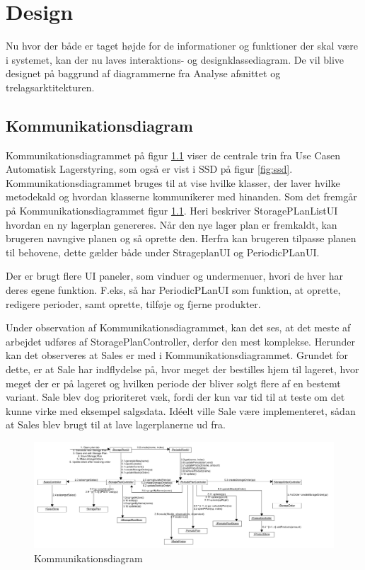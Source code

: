 \chapter{Design}\label{ch:design}
Nu hvor der både er taget højde for de informationer og funktioner der skal være i systemet, kan der nu laves interaktions- og designklassediagram. De vil blive designet på baggrund af diagrammerne fra Analyse afsnittet og trelagsarktitekturen. 

\section{Kommunikationsdiagram}
Kommunikationsdiagrammet\cite{Larman2004} på figur \ref{fig:Kommunikationsdiagram} viser de centrale trin fra Use Casen Automatisk Lagerstyring, som også er vist i SSD på figur \ref{fig:ssd}. Kommunikationsdiagrammet bruges til at vise hvilke klasser, der laver hvilke metodekald og hvordan klasserne kommunikerer med hinanden. 
Som det fremgår på Kommunikationsdiagrammet figur \ref{fig:Kommunikationsdiagram}. Heri beskriver StoragePLanListUI hvordan en ny lagerplan genereres. Når den nye lager plan er fremkaldt, kan brugeren navngive planen og så oprette den. Herfra kan brugeren tilpasse planen til behovene, dette gælder både under StrageplanUI og PeriodicPLanUI. 

Der er brugt flere UI paneler, som vinduer og undermenuer, hvori de hver har deres egene funktion. 
F.eks, så har PeriodicPLanUI som funktion, at oprette, redigere perioder, samt oprette, tilføje og fjerne produkter. 

Under observation af Kommunikationsdiagrammet, kan det ses, at det meste af arbejdet udføres af StoragePlanController, derfor den mest komplekse. Herunder kan det observeres at Sales er med i Kommunikationsdiagrammet. Grundet for dette, er at Sale har indflydelse på, hvor meget der bestilles hjem til lageret, hvor meget der er på lageret og hvilken periode der bliver solgt flere af en bestemt variant. 
Sale blev dog prioriteret væk, fordi der kun var tid til at teste om det kunne virke med eksempel salgsdata.
Idéelt ville Sale være implementeret, sådan at Sales blev brugt til at lave lagerplanerne ud fra.



\begin{landscape}
    \begin{figure}[p]
        \centering
        \includegraphics[width=0.8\hsize]{figures/design/Kommunikationsdiagram}
        \caption{Kommunikationsdiagram}
        \label{fig:Kommunikationsdiagram}
    \end{figure}
\end{landscape}

